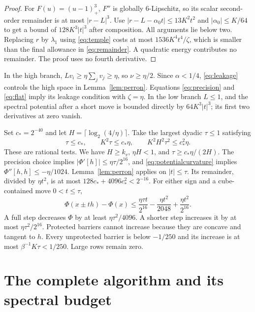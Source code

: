 \documentclass[11pt]{amsart}
\theoremstyle{remark}\newtheorem{remark}[theorem]{Remark}
\begin{document}
\begin{proof}
For $F(u)=(u-1)_+^3$, $F''$ is globally 6-Lipschitz, so its scalar
second-order remainder is at most $|r-L|^3$.
Use $|r-L-\alpha_0t|\le13K^2t^2$ and
$|\alpha_0|\le K/64$ to get a bound of $128K^3|t|^3$ after composition.
All arguments lie below two. Replacing $r$ by $\lambda_1$ using
\eqref{eq:temple} costs at most $1536K^4t^4/\zeta$, which is smaller
than the final allowance in \eqref{eq:remainder}. A quadratic energy
contributes no remainder. The proof uses no fourth derivative.
\end{proof}

In the high branch, $Lv_i\ge\eta\sum_jv_j\ge\eta$, so
$\nu\ge\eta/2$. Since $\alpha<1/4$, \eqref{eq:leakage} controls the
high space in Lemma~\ref{lem:perron}.
Equations \eqref{eq:precision} and \eqref{eq:flat} imply its leakage
condition with $\zeta=\eta$.
In the low branch $L\le1$, and the spectral potential after a short move
is bounded directly by $64K^3|t|^3$; its first two derivatives at zero vanish.

Set $c_*=2^{-40}$ and let $H=\lceil\log_2(4/\eta)\rceil$.
Take the largest dyadic $\tau\le1$ satisfying
\begin{equation}\label{eq:stepschedule}
 \tau\le c_*,\qquad K^2\tau\le c_*\eta,\qquad
 K^2H^2\tau^2\le c_*^2\eta.
\end{equation}
These are rational tests. We have $H\ge k_v$, $\eta H<1$,
and $\tau\ge c_*\eta/(2H)$.
The precision choice implies
$|\Phi'[h]|\le\eta\tau/2^{16}$, and
\eqref{eq:potentialcurvature} implies $\Phi''[h,h]\le-\eta/1024$.
Lemma~\ref{lem:perron} applies on $|t|\le\tau$.
Its remainder, divided by $\eta t^2$, is at most
$128c_*+4096c_*^2<2^{-16}$.
For either sign and a cube-contained move $0<t\le\tau$,
\begin{equation}\label{eq:onestep}
 \Phi(x\pm th)-\Phi(x)
 \le\frac{\eta\tau t}{2^{16}}-\frac{\eta t^2}{2048}
                              +\frac{\eta t^2}{2^{16}}.
\end{equation}
A full step decreases $\Phi$ by at least $\eta\tau^2/4096$.
A shorter step increases it by at most $\eta\tau^2/2^{16}$.
Protected barriers cannot increase because they are concave and tangent to
$h$. Every unprotected barrier is below $-1/250$ and its increase is at
most $\beta^{-1}K\tau<1/250$. Large rows remain zero.

\section{The complete algorithm and its spectral budget}\label{sec:algorithm}
\end{document}
